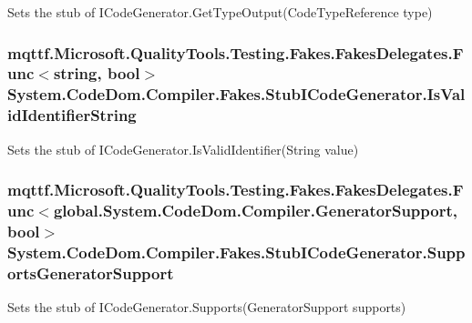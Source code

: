 Sets the stub of I\-Code\-Generator.\-Get\-Type\-Output(\-Code\-Type\-Reference type)

\hypertarget{class_system_1_1_code_dom_1_1_compiler_1_1_fakes_1_1_stub_i_code_generator_a7dce71813359065492729ebb34f9efba}{
\subsubsection[{Is\-Valid\-Identifier\-String}]{\setlength{\rightskip}{0pt plus 5cm}mqttf.\-Microsoft.\-Quality\-Tools.\-Testing.\-Fakes.\-Fakes\-Delegates.\-Func$<$string, bool$>$ System.\-Code\-Dom.\-Compiler.\-Fakes.\-Stub\-I\-Code\-Generator.\-Is\-Valid\-Identifier\-String}}\label{class_system_1_1_code_dom_1_1_compiler_1_1_fakes_1_1_stub_i_code_generator_a7dce71813359065492729ebb34f9efba}


Sets the stub of I\-Code\-Generator.\-Is\-Valid\-Identifier(\-String value)

\hypertarget{class_system_1_1_code_dom_1_1_compiler_1_1_fakes_1_1_stub_i_code_generator_a5c35c6c4abf3de2292c409f62033e19d}{
\subsubsection[{Supports\-Generator\-Support}]{\setlength{\rightskip}{0pt plus 5cm}mqttf.\-Microsoft.\-Quality\-Tools.\-Testing.\-Fakes.\-Fakes\-Delegates.\-Func$<$global.\-System.\-Code\-Dom.\-Compiler.\-Generator\-Support, bool$>$ System.\-Code\-Dom.\-Compiler.\-Fakes.\-Stub\-I\-Code\-Generator.\-Supports\-Generator\-Support}}\label{class_system_1_1_code_dom_1_1_compiler_1_1_fakes_1_1_stub_i_code_generator_a5c35c6c4abf3de2292c409f62033e19d}


Sets the stub of I\-Code\-Generator.\-Supports(\-Generator\-Support supports)

